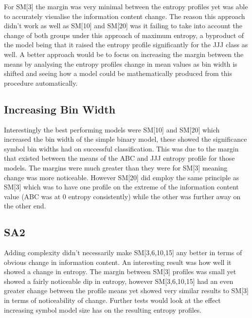 For SM[3] the margin was very minimal between the entropy profiles yet was able to accurately visualise the information content change. The reason this approach didn't work as well as SM[10] and SM[20] was it failing to take into account the change of both groups under this approach of maximum entropy, a byproduct of the model being that it raised the entropy profile significantly for the JJJ class as well. A better approach would be to focus on increasing the margin between the means by analysing the entropy profiles change in mean values as bin width is shifted and seeing how a model could be mathematically produced from this procedure automatically. \\

\subsection{Increasing Bin Width}
Interestingly the best performing models were SM[10] and SM[20] which increased the bin width of the simple binary model, these showed the significance symbol bin widths had on successful classification. This was due to the margin that existed between the means of the ABC and JJJ entropy profile for those models. The margins were much greater than they were for SM[3] meaning change was more noticeable. However SM[20] did employ the same principle as SM[3] which was to have one profile on the extreme of the information content value (ABC was at 0 entropy consistently) while the other was further away on the other end. \\ 


\subsection{SA2}
Adding complexity didn't necessarily make SM[3,6,10,15] any better in terms of obvious change in information content. An interesting result was how well it showed a change in entropy. The margin between SM[3] profiles was small yet showed a fairly noticeable dip in entropy, however SM[3,6,10,15] had an even greater change between the profile means yet showed very similar results to SM[3] in terms of noticeability of change. Further tests would look at the effect increasing symbol model size has on the resulting entropy profiles.\\
%

